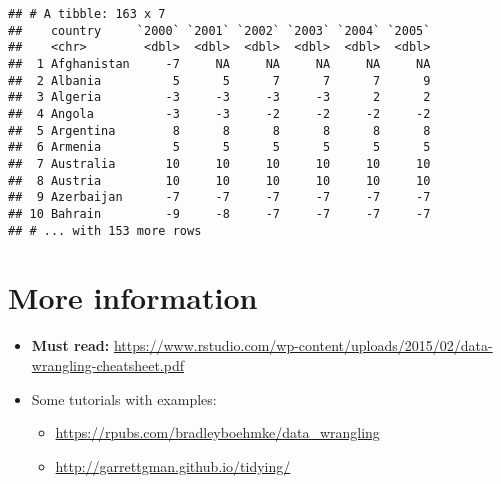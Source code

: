 \documentclass[11pt,]{article}
\providecommand{\tightlist}{%
  \setlength{\itemsep}{0pt}\setlength{\parskip}{0pt}}
\begin{document}
\begin{verbatim}
## # A tibble: 163 x 7
##    country     `2000` `2001` `2002` `2003` `2004` `2005`
##    <chr>        <dbl>  <dbl>  <dbl>  <dbl>  <dbl>  <dbl>
##  1 Afghanistan     -7     NA     NA     NA     NA     NA
##  2 Albania          5      5      7      7      7      9
##  3 Algeria         -3     -3     -3     -3      2      2
##  4 Angola          -3     -3     -2     -2     -2     -2
##  5 Argentina        8      8      8      8      8      8
##  6 Armenia          5      5      5      5      5      5
##  7 Australia       10     10     10     10     10     10
##  8 Austria         10     10     10     10     10     10
##  9 Azerbaijan      -7     -7     -7     -7     -7     -7
## 10 Bahrain         -9     -8     -7     -7     -7     -7
## # ... with 153 more rows
\end{verbatim}

\section{More information}\label{more-information}

\begin{itemize}
\tightlist
\item
  \textbf{Must read:}
  \url{https://www.rstudio.com/wp-content/uploads/2015/02/data-wrangling-cheatsheet.pdf}
\item
  Some tutorials with examples:

  \begin{itemize}
  \tightlist
  \item
    \url{https://rpubs.com/bradleyboehmke/data_wrangling}
  \item
    \url{http://garrettgman.github.io/tidying/}
  \end{itemize}
\end{itemize}
\end{document}
